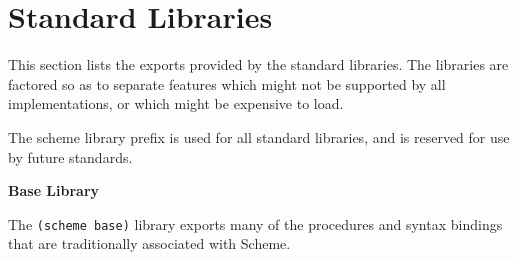 \chapter{Standard Libraries}
\label{stdlibraries}


This section lists the exports provided by the standard libraries.  The
libraries are factored so as to separate features which might not be
supported by all implementations, or which might be expensive to load.

The {\cf scheme} library prefix is used for all standard libraries, and
is reserved for use by future standards.

\textbf{Base Library}

The \texttt{(scheme base)} library exports many of the procedures and
syntax bindings that are traditionally associated with Scheme.

